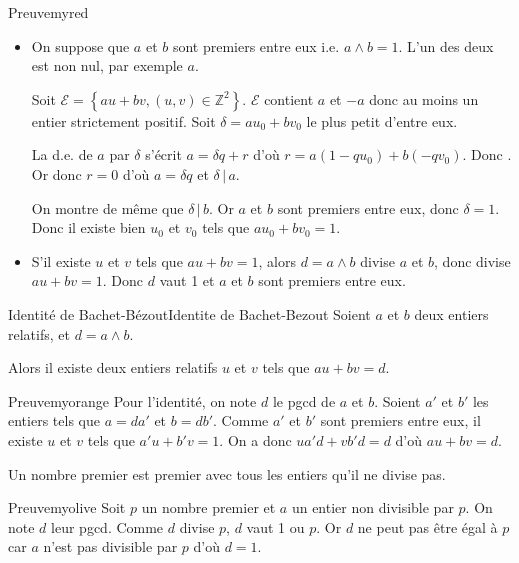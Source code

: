     \begin{demo}{Preuve}{myred}
        \begin{itemize}
            \item On suppose que $a$ et $b$ sont premiers entre eux i.e. $a \wedge b = 1$. L’un des deux est non nul, par exemple $a$. 
            
            Soit $\mathcal{E} = \left\{ au + bv, (u,v) \in \mathbb{Z}^2 \right\}$. $\mathcal{E}$ contient $a$ et $-a$ donc au moins un entier strictement positif. Soit $\delta = a u_0 + b v_0$ le plus petit d’entre eux. 

            La d.e. de $a$ par $\delta$ s’écrit $a = \delta q + r$ d’où $r = a(1 -q u_0) + b(-q v_0)$. Donc . Or  donc $r = 0$ d’où $a = \delta q$ et $\delta \, | \, a$. 

            On montre de même que $\delta \, | \, b$. Or $a$ et $b$ sont premiers entre eux, donc $\delta = 1$. Donc il existe bien $u_0$ et $v_0$ tels que $a u_0 + b v_0 = 1$.
            \item S’il existe $u$ et $v$ tels que $au + bv = 1$, alors $d = a \wedge b$ divise $a$ et $b$, donc divise $au + bv = 1$. Donc $d$ vaut 1 et $a$ et $b$ sont premiers entre eux.
        \end{itemize}
    \end{demo}

    \begin{coro}{Identité de Bachet-Bézout}{Identite de Bachet-Bezout}
        Soient $a$ et $b$ deux entiers relatifs, et $d = a \wedge b$.
        
        Alors il existe deux entiers relatifs $u$ et $v$ tels que $au + bv = d$.
    \end{coro}

    \begin{demo}{Preuve}{myorange}
        Pour l’identité, on note $d$ le pgcd de $a$ et $b$. Soient $a'$ et $b'$ les entiers tels que $a = da'$ et $b = db'$. Comme $a'$ et $b'$ sont premiers entre eux, il existe $u$ et $v$ tels que $a' u + b' v = 1$. On a donc $ua'd + vb'd = d$ d’où $au + bv = d$.
    \end{demo}

    \begin{prop}{}{}
        Un nombre premier est premier avec tous les entiers qu’il ne divise pas.
    \end{prop}

    \begin{demo}{Preuve}{myolive}
        Soit $p$ un nombre premier et $a$ un entier non divisible par $p$. On note $d$ leur pgcd. Comme $d$ divise $p$, $d$ vaut 1 ou $p$. Or $d$ ne peut pas être égal à $p$ car $a$ n’est pas divisible par $p$ d’où $d = 1$.
    \end{demo}

